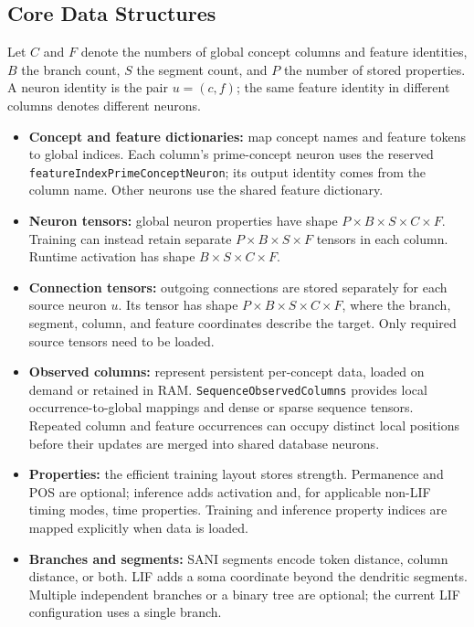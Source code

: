\subsection{Core Data Structures}
Let $C$ and $F$ denote the numbers of global concept columns and feature identities, $B$ the branch count, $S$ the segment count, and $P$ the number of stored properties. A neuron identity is the pair $u=(c,f)$; the same feature identity in different columns denotes different neurons.
\begin{itemize}
	\item \textbf{Concept and feature dictionaries:} map concept names and feature tokens to global indices. Each column's prime-concept neuron uses the reserved \texttt{featureIndexPrimeConceptNeuron}; its output identity comes from the column name. Other neurons use the shared feature dictionary.
	\item \textbf{Neuron tensors:} global neuron properties have shape $P\times B\times S\times C\times F$. Training can instead retain separate $P\times B\times S\times F$ tensors in each column. Runtime activation has shape $B\times S\times C\times F$.
	\item \textbf{Connection tensors:} outgoing connections are stored separately for each source neuron $u$. Its tensor has shape $P\times B\times S\times C\times F$, where the branch, segment, column, and feature coordinates describe the target. Only required source tensors need to be loaded.
	\item \textbf{Observed columns:} represent persistent per-concept data, loaded on demand or retained in RAM. \texttt{SequenceObservedColumns} provides local occurrence-to-global mappings and dense or sparse sequence tensors. Repeated column and feature occurrences can occupy distinct local positions before their updates are merged into shared database neurons.
	\item \textbf{Properties:} the efficient training layout stores strength. Permanence and POS are optional; inference adds activation and, for applicable non-LIF timing modes, time properties. Training and inference property indices are mapped explicitly when data is loaded.
	\item \textbf{Branches and segments:} SANI segments encode token distance, column distance, or both. LIF adds a soma coordinate beyond the dendritic segments. Multiple independent branches or a binary tree are optional; the current LIF configuration uses a single branch.
\end{itemize}

